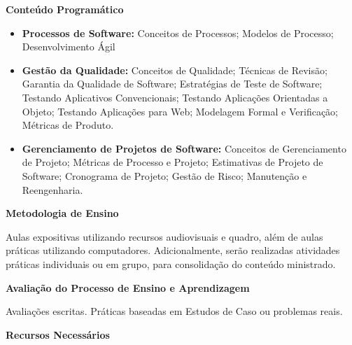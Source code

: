 \begin{snugshade}\begin{center}\textbf{
    Conteúdo Programático
}\end{center}\end{snugshade}

\begin{itemize}

 \item \textbf{Processos de Software:} Conceitos de Processos; Modelos de Processo; Desenvolvimento Ágil
 
  \item \textbf{Gestão da Qualidade:} Conceitos de Qualidade; Técnicas de Revisão; Garantia da Qualidade de Software; Estratégias de Teste de Software; Testando Aplicativos Convencionais; Testando Aplicações Orientadas a Objeto; Testando Aplicações para Web; Modelagem Formal e Verificação; Métricas de Produto.
 \item \textbf{Gerenciamento de Projetos de Software:}  Conceitos de Gerenciamento de Projeto; Métricas de Processo e Projeto; Estimativas de Projeto de Software; Cronograma de Projeto; Gestão de Risco; Manutenção e Reengenharia.

\end{itemize}

\begin{snugshade}\begin{center}\textbf{
    Metodologia de Ensino
}\end{center}\end{snugshade} 

\noindent
   Aulas expositivas utilizando recursos audiovisuais e quadro, além de aulas práticas utilizando computadores. Adicionalmente, serão realizadas atividades práticas individuais ou em grupo, para consolidação do conteúdo ministrado.

\begin{snugshade}\begin{center}\textbf{
    Avaliação do Processo de Ensino e Aprendizagem
}\end{center}\end{snugshade}   

\noindent
  Avaliações escritas. Práticas baseadas em Estudos de Caso ou problemas reais.


\begin{snugshade}\begin{center}\textbf{
    Recursos Necessários
    \vphantom{q} %
}\end{center}\end{snugshade}

